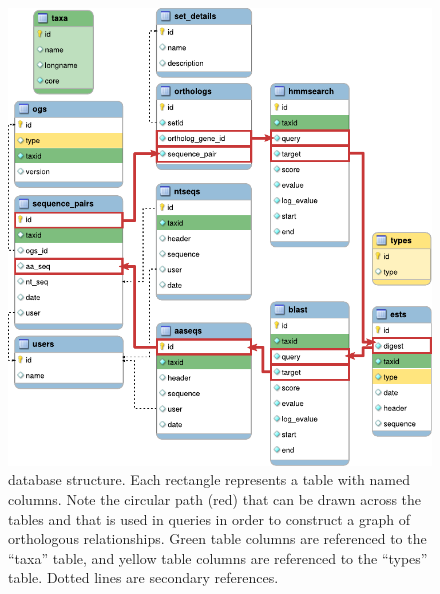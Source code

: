 \begin{figure}[ht]
	\centering
	\includegraphics[width=\textwidth]{img/dbstructure.pdf}
	\caption[\pname database structure]{
		\pname database structure. Each rectangle represents a table with named
		columns. Note the circular path (red) that can be drawn across the tables and
		that is used in  queries in order to construct a graph of
		orthologous relationships. Green table columns are referenced to the ``taxa''
		table, and yellow table columns are referenced to the ``types'' table. Dotted
		lines are secondary references.
	}
	\label{fig:dbstructure}
\end{figure}


